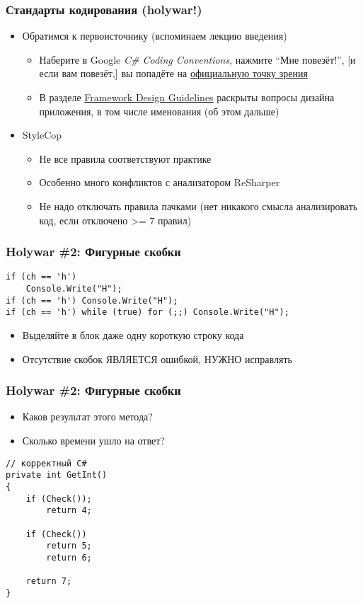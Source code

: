 \documentclass[xetex,mathserif,serif]{beamer}
\begin{document}
	\begin{frame}
		\frametitle{Стандарты кодирования (holywar!)}
		\begin{itemize}
			\item Обратимся к первоисточнику (вспоминаем лекцию введения)
			\begin{itemize}
				\item Наберите в Google \textit{C\# Coding Conventions}, нажмите ``Мне повезёт!'', [и если вам повезёт,] вы попадёте на \href{https://docs.microsoft.com/en-us/dotnet/csharp/programming-guide/inside-a-program/coding-conventions}{официальную точку зрения}
				\item В разделе \href{https://docs.microsoft.com/en-us/dotnet/standard/design-guidelines/}{Framework Design Guidelines} раскрыты вопросы дизайна приложения, в том числе именования (об этом дальше)
			\end{itemize}
			\item StyleCop
			\begin{itemize}
				\item Не все правила соответствуют практике
				\item Особенно много конфликтов с анализатором ReSharper
				\item Не надо отключать правила пачками \newline
					(нет никакого смысла анализировать код, если отключено >= 7 правил)
			\end{itemize}
		\end{itemize}
	\end{frame}

	\begin{frame}[fragile]
		\frametitle{Holywar \#2: Фигурные скобки}
		\begin{verbatim}
if (ch == 'h')
    Console.Write("H");
if (ch == 'h') Console.Write("H");
if (ch == 'h') while (true) for (;;) Console.Write("H");
		\end{verbatim}
		\begin{itemize}
			\item Выделяйте в блок даже одну короткую строку кода
			\item Отсутствие скобок ЯВЛЯЕТСЯ ошибкой, НУЖНО исправлять
		\end{itemize}
	\end{frame}

	\begin{frame}[fragile]
		\frametitle{Holywar \#2: Фигурные скобки}
		\begin{itemize}
			\item Каков результат этого метода?
			\item Сколько времени ушло на ответ?
		\end{itemize}
		\begin{verbatim}
// корректный C#
private int GetInt()
{
    if (Check());
        return 4;

    if (Check())
        return 5;
        return 6;

    return 7;
}
		\end{verbatim}
	\end{frame}
\end{document}
